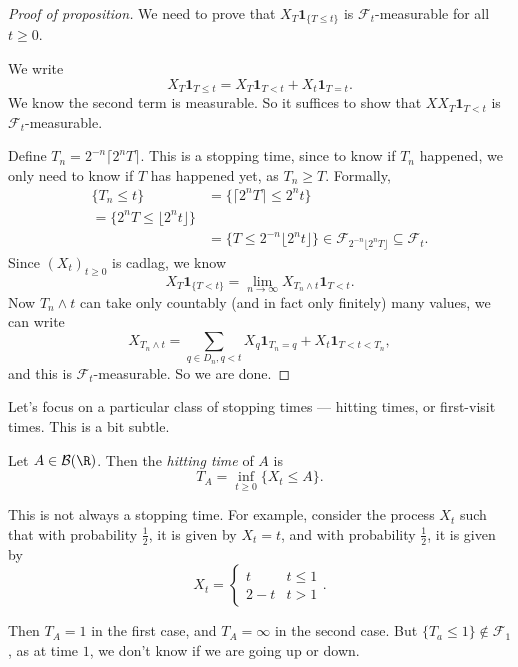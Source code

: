 \documentclass[a4paper]{article}
\begin{document}
\begin{proof}[Proof of proposition]
  We need to prove that $X_T \mathbf{1}_{\{T \leq t\}}$ is $\mathcal{F}_t$-measurable for all $t \geq 0$.

  We write
  \[
    X_T\mathbf{1}_{T \leq t} = X_T \mathbf{1}_{T < t} + X_t \mathbf{1}_{T = t}.
  \]
  We know the second term is measurable. So it suffices to show that $XX_T \mathbf{1}_{T < t}$ is $\mathcal{F}_t$-measurable.

  Define $T_n = 2^{-n} \lceil 2^n T\rceil$. This is a stopping time, since to know if $T_n$ happened, we only need to know if $T$ has happened yet, as $T_n \geq T$. Formally,
  \begin{align*}
    \{T_n \leq t\} &= \{\lceil 2^n T \rceil \leq 2^n t\} \\
    = \{2^n T \leq \lfloor 2^n t\rfloor\} \\
    &= \{T \leq 2^{-n} \lfloor 2^n t \rfloor\} \in \mathcal{F}_{2^{-n}\lfloor 2^n T\rfloor} \subseteq \mathcal{F}_t.
  \end{align*}
  Since $(X_t)_{t \geq 0}$ is cadlag, we know
  \[
    X_T \mathbf{1}_{\{T < t\}} = \lim_{n \to \infty} X_{T_n \wedge t} \mathbf{1}_{T < t}.
  \]
  Now $T_n \wedge t$ can take only countably (and in fact only finitely) many values, we can write
  \[
    X_{T_n \wedge t} = \sum_{q \in D_n, q < t} X_{q} \mathbf{1}_{T_n = q} + X_t \mathbf{1}_{T < t < T_n},
  \]
  and this is $\mathcal{F}_t$-measurable. So we are done.
\end{proof}

Let's focus on a particular class of stopping times --- hitting times, or first-visit times. This is a bit subtle.

\begin{defi}
  Let $A \in \mathcal{B}(\R)$. Then the \emph{hitting time} of $A$ is
  \[
    T_A = \inf_{t \geq 0} \{X_t \leq A\}.
  \]
\end{defi}

This is not always a stopping time. For example, consider the process $X_t$ such that with probability $\frac{1}{2}$, it is given by $X_t = t$, and with probability $\frac{1}{2}$, it is given by
\[
  X_t = 
  \begin{cases}
    t & t \leq 1\\
    2 - t & t > 1
  \end{cases}.
\]
\begin{center}
\end{center}
Then $T_A = 1$ in the first case, and $T_A = \infty$ in the second case. But $\{T_a \leq 1\} \not \in \mathcal{F}_1$, as at time $1$, we don't know if we are going up or down.
\end{document}
